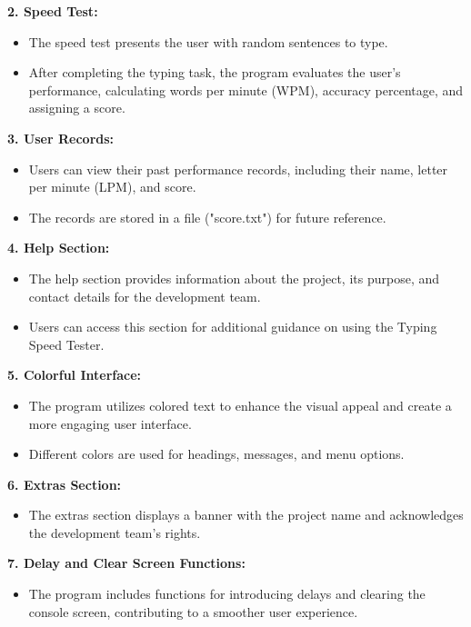 \textbf{ 2. Speed Test:}
\begin{itemize}
    \item The speed test presents the user with random sentences to type.
    \item After completing the typing task, the program evaluates the user's performance, calculating words per minute (WPM), accuracy percentage, and assigning a score.
\end{itemize}

\newpage

\textbf{ 3. User Records:}
\begin{itemize}
     \item Users can view their past performance records, including their name, letter per minute (LPM), and score.
    \item The records are stored in a file ("score.txt") for future reference.
\end{itemize}

\textbf{ 4. Help Section:}
\begin{itemize}
    \item The help section provides information about the project, its purpose, and contact details for the development team.
    \item Users can access this section for additional guidance on using the Typing Speed Tester.
\end{itemize}

\textbf{ 5. Colorful Interface:}

\begin{itemize}
    \item The program utilizes colored text to enhance the visual appeal and create a more engaging user interface.
    \item Different colors are used for headings, messages, and menu options.
\end{itemize}

\textbf{ 6. Extras Section:}
\begin{itemize}
    \item The extras section displays a banner with the project name and acknowledges the development team's rights.
\end{itemize}

\textbf{7. Delay and Clear Screen Functions:} 
\begin{itemize}
    \item The program includes functions for introducing delays and clearing the console screen, contributing to a smoother user experience.
\end{itemize}

